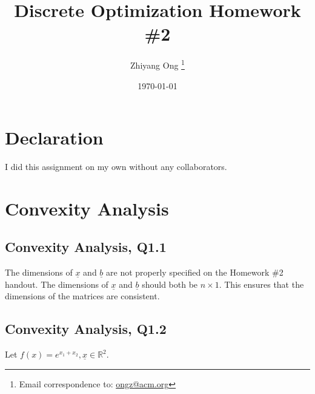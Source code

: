 \documentclass[letter,12pt]{article}
\begin{document}
\title{Discrete Optimization Homework \#2}
\date{\today}
\author{Zhiyang Ong
	\thanks{Email correspondence to: \href{mailto:ongz@acm.org}{ongz@acm.org}}
}
\maketitle






\section*{Declaration}
\label{sec:declaration}

I did this assignment on my own without any collaborators. %







\section{Convexity Analysis}
\label{sec:convexityanalysis}

\subsection{Convexity Analysis, Q1.1}
\label{ssec:q1a}

The dimensions of $\underline{x}$ and $\underline{b}$ are not properly specified on the Homework \#2 handout. The dimensions of $\underline{x}$ and $\underline{b}$ should both be $n \times 1$. This ensures that the dimensions of the matrices are consistent. \\







\subsection{Convexity Analysis, Q1.2}
\label{ssec:q1b}

Let $f(x) = e^{x_{1} + x_{2}}, \underline{x} \in \mathbb{R}^{2}$.
\end{document}
